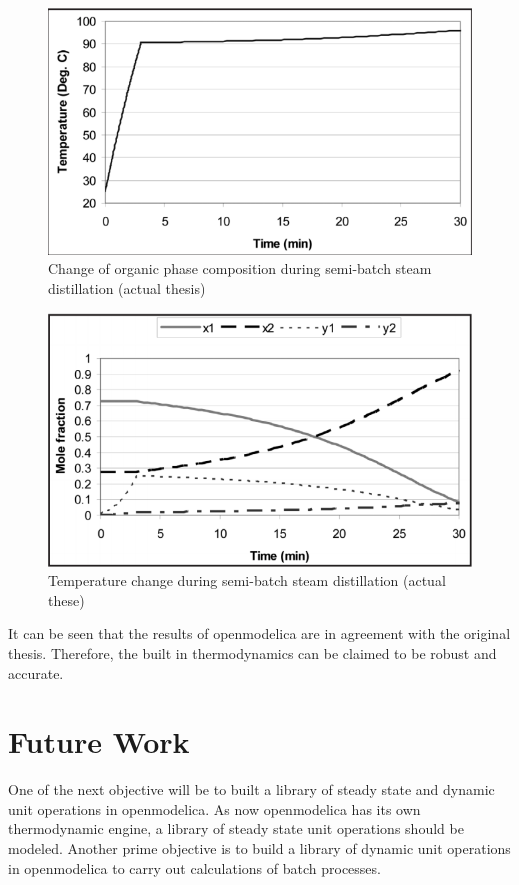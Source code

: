 \documentclass[12pt]{report}
\begin{document}
\begin{figure}
\centering
\includegraphics[width=0.9\linewidth]{SD3}
\caption{Change of organic phase composition during semi-batch steam distillation (actual thesis)}
\label{SD3}
\end{figure}
\begin{figure}
\centering
\includegraphics[width=0.9\linewidth]{SD4}
\caption{Temperature change during semi-batch steam distillation (actual these)}
\label{SD4}
\end{figure}

It can be seen that the results of openmodelica are in agreement with the original thesis. Therefore, the built in thermodynamics can be claimed to be robust and accurate.

\chapter{Future Work}
One of the next objective will be to built a library of steady state and dynamic unit operations in openmodelica. As now openmodelica has its own thermodynamic engine, a library of steady state unit operations should be modeled. Another prime objective is to build a library of dynamic unit operations in openmodelica to carry out calculations of batch processes.
\end{document}
